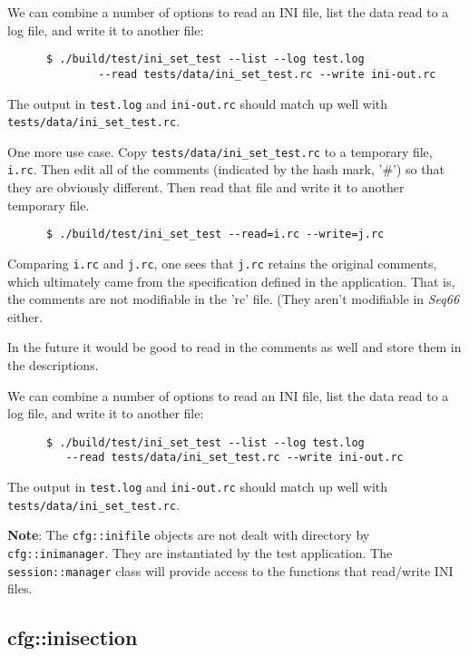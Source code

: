    We can combine a number of options to read an INI file, list the
   data read to a log file, and write it to another file:

   \begin{verbatim}
      $ ./build/test/ini_set_test --list --log test.log
              --read tests/data/ini_set_test.rc --write ini-out.rc
   \end{verbatim}

   The output in \texttt{test.log} and \texttt{ini-out.rc}
   should match up well with \texttt{tests/data/ini\_set\_test.rc}.

   One more use case. Copy \texttt{tests/data/ini\_set\_test.rc}
   to a temporary file, \texttt{i.rc}.
   Then edit all of the comments (indicated by the hash mark, '\#')
   so that they are obviously different.
   Then read that file and write it to another temporary file.

   \begin{verbatim}
      $ ./build/test/ini_set_test --read=i.rc --write=j.rc
   \end{verbatim}

   Comparing \texttt{i.rc} and \texttt{j.rc}, one sees that
   \texttt{j.rc} retains the original comments, which ultimately
   came from the specification defined in the application.
   That is, the comments are not modifiable in the 'rc' file.
   (They aren't modifiable in \textsl{Seq66} either.

   In the future it would be good to read in the comments as well
   and store them in the descriptions.

   We can combine a number of options to read an INI file, list the
   data read to a log file, and write it to another file:

   \begin{verbatim}
      $ ./build/test/ini_set_test --list --log test.log
         --read tests/data/ini_set_test.rc --write ini-out.rc
   \end{verbatim}

   The output in \texttt{test.log} and \texttt{ini-out.rc}
   should match up well with \texttt{tests/data/ini\_set\_test.rc}.

   \textbf{Note}: The \texttt{cfg::inifile} objects are not dealt with
   directory by \texttt{cfg::inimanager}. They are instantiated by the
   test application. The \texttt{session::manager} class will provide
   access to the functions that read/write INI files.

\subsection{cfg::inisection}
\label{subsec:cfg_namespace_inisection}

